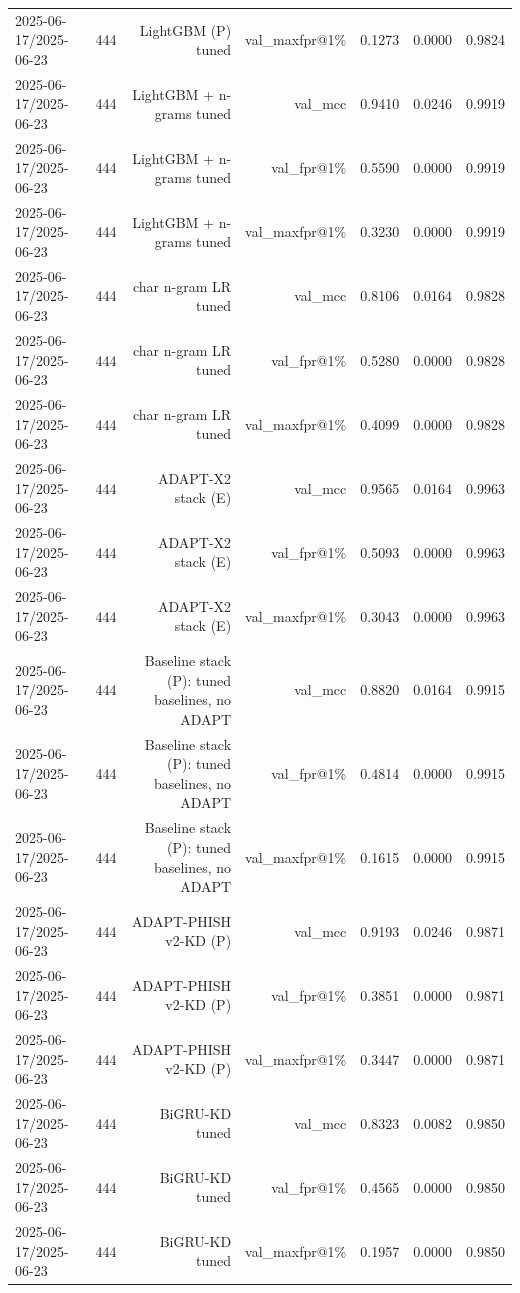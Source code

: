 \begin{table}[t]
\begin{tabular}{llrrrrr}
2025-06-17/2025-06-23 & 444 & LightGBM (P) tuned & val\_maxfpr@1\% & 0.1273 & 0.0000 & 0.9824 \\
2025-06-17/2025-06-23 & 444 & LightGBM + n-grams tuned & val\_mcc & 0.9410 & 0.0246 & 0.9919 \\
2025-06-17/2025-06-23 & 444 & LightGBM + n-grams tuned & val\_fpr@1\% & 0.5590 & 0.0000 & 0.9919 \\
2025-06-17/2025-06-23 & 444 & LightGBM + n-grams tuned & val\_maxfpr@1\% & 0.3230 & 0.0000 & 0.9919 \\
2025-06-17/2025-06-23 & 444 & char n-gram LR tuned & val\_mcc & 0.8106 & 0.0164 & 0.9828 \\
2025-06-17/2025-06-23 & 444 & char n-gram LR tuned & val\_fpr@1\% & 0.5280 & 0.0000 & 0.9828 \\
2025-06-17/2025-06-23 & 444 & char n-gram LR tuned & val\_maxfpr@1\% & 0.4099 & 0.0000 & 0.9828 \\
2025-06-17/2025-06-23 & 444 & ADAPT-X2 stack (E) & val\_mcc & 0.9565 & 0.0164 & 0.9963 \\
2025-06-17/2025-06-23 & 444 & ADAPT-X2 stack (E) & val\_fpr@1\% & 0.5093 & 0.0000 & 0.9963 \\
2025-06-17/2025-06-23 & 444 & ADAPT-X2 stack (E) & val\_maxfpr@1\% & 0.3043 & 0.0000 & 0.9963 \\
2025-06-17/2025-06-23 & 444 & Baseline stack (P): tuned baselines, no ADAPT & val\_mcc & 0.8820 & 0.0164 & 0.9915 \\
2025-06-17/2025-06-23 & 444 & Baseline stack (P): tuned baselines, no ADAPT & val\_fpr@1\% & 0.4814 & 0.0000 & 0.9915 \\
2025-06-17/2025-06-23 & 444 & Baseline stack (P): tuned baselines, no ADAPT & val\_maxfpr@1\% & 0.1615 & 0.0000 & 0.9915 \\
2025-06-17/2025-06-23 & 444 & ADAPT-PHISH v2-KD (P) & val\_mcc & 0.9193 & 0.0246 & 0.9871 \\
2025-06-17/2025-06-23 & 444 & ADAPT-PHISH v2-KD (P) & val\_fpr@1\% & 0.3851 & 0.0000 & 0.9871 \\
2025-06-17/2025-06-23 & 444 & ADAPT-PHISH v2-KD (P) & val\_maxfpr@1\% & 0.3447 & 0.0000 & 0.9871 \\
2025-06-17/2025-06-23 & 444 & BiGRU-KD tuned & val\_mcc & 0.8323 & 0.0082 & 0.9850 \\
2025-06-17/2025-06-23 & 444 & BiGRU-KD tuned & val\_fpr@1\% & 0.4565 & 0.0000 & 0.9850 \\
2025-06-17/2025-06-23 & 444 & BiGRU-KD tuned & val\_maxfpr@1\% & 0.1957 & 0.0000 & 0.9850 \\

\end{tabular}
\end{table}

